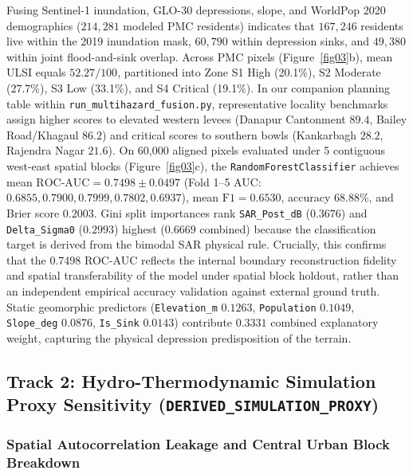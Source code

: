 \documentclass[OA,linenum]{InterPore}
\begin{document}
Fusing Sentinel-1 inundation, GLO-30 depressions, slope, and WorldPop 2020 demographics ($214,281$ modeled PMC residents) indicates that $167,246$ residents live within the 2019 inundation mask, $60,790$ within depression sinks, and $49,380$ within joint flood-and-sink overlap. Across PMC pixels (Figure~\ref{fig03}b), mean ULSI equals $52.27/100$, partitioned into Zone S1 High (20.1\%), S2 Moderate (27.7\%), S3 Low (33.1\%), and S4 Critical (19.1\%). In our companion planning table within \texttt{run\_multihazard\_fusion.py}, representative locality benchmarks assign higher scores to elevated western levees (Danapur Cantonment $89.4$, Bailey Road/Khagaul $86.2$) and critical scores to southern bowls (Kankarbagh $28.2$, Rajendra Nagar $21.6$). On 60,000 aligned pixels evaluated under 5 contiguous west-east spatial blocks (Figure~\ref{fig03}c), the \texttt{RandomForestClassifier} achieves mean $\text{ROC-AUC} = 0.7498 \pm 0.0497$ (Fold 1--5 AUC: $0.6855, 0.7900, 0.7999, 0.7802, 0.6937$), mean $\text{F1} = 0.6530$, accuracy 68.88\%, and Brier score $0.2003$. Gini split importances rank \texttt{SAR\_Post\_dB} ($0.3676$) and \texttt{Delta\_Sigma0} ($0.2993$) highest ($0.6669$ combined) because the classification target is derived from the bimodal SAR physical rule. Crucially, this confirms that the 0.7498 ROC-AUC reflects the internal boundary reconstruction fidelity and spatial transferability of the model under spatial block holdout, rather than an independent empirical accuracy validation against external ground truth. Static geomorphic predictors (\texttt{Elevation\_m} $0.1263$, \texttt{Population} $0.1049$, \texttt{Slope\_deg} $0.0876$, \texttt{Is\_Sink} $0.0143$) contribute $0.3331$ combined explanatory weight, capturing the physical depression predisposition of the terrain.

\subsection{Track 2: Hydro-Thermodynamic Simulation Proxy Sensitivity (\texttt{DERIVED\_SIMULATION\_PROXY})}

\subsubsection{Spatial Autocorrelation Leakage and Central Urban Block Breakdown}
\end{document}
